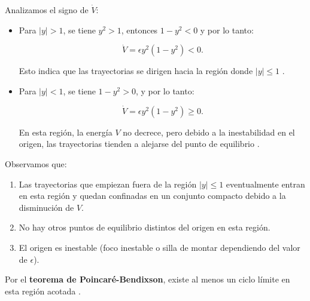 Analizamos el signo de \(\dot{V}\):

\begin{itemize}
    \item Para \( |y| > 1 \), se tiene \( y^2 > 1 \), entonces \( 1 - y^2 < 0 \) y por lo tanto:

    \begin{equation}
        \dot{V} = \epsilon y^2 (1 - y^2) < 0.
    \end{equation}

    Esto indica que las trayectorias se dirigen hacia la región donde \( |y| \leq 1 \) \cite{hahn1967stability}.

    \item Para \( |y| < 1 \), se tiene \( 1 - y^2 > 0 \), y por lo tanto:

    \begin{equation}
        \dot{V} = \epsilon y^2 (1 - y^2) \geq 0.
    \end{equation}

    En esta región, la energía \( V \) no decrece, pero debido a la inestabilidad en el origen, las trayectorias tienden a alejarse del punto de equilibrio \cite{lasalle1961stability}.
\end{itemize}

Observamos que:

\begin{enumerate}
    \item Las trayectorias que empiezan fuera de la región \( |y| \leq 1 \) eventualmente entran en esta región y quedan confinadas en un conjunto compacto debido a la disminución de \( V \).

    \item No hay otros puntos de equilibrio distintos del origen en esta región.

    \item El origen es inestable (foco inestable o silla de montar dependiendo del valor de \(\epsilon\)).
\end{enumerate}

Por el \textbf{teorema de Poincaré-Bendixson}, existe al menos un ciclo límite en esta región acotada \cite{guckenheimer1983nonlinear}.
